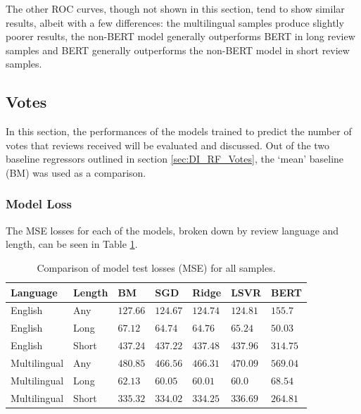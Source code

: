 The other ROC curves, though not shown in this section, tend to show similar results, albeit with a few differences: the multilingual samples produce slightly poorer results, the non-BERT model generally outperforms BERT in long review samples and BERT generally outperforms the non-BERT model in short review samples.

\subsection{Votes} \label{sec:Res_RF_Votes}

In this section, the performances of the models trained to predict the number of votes that reviews received will be evaluated and discussed. Out of the two baseline regressors outlined in section \ref{sec:DI_RF_Votes}, the `mean' baseline (BM) was used as a comparison.

\subsubsection{Model Loss}

The MSE losses for each of the models, broken down by review language and length, can be seen in Table \ref{tab:Res_RF_Votes_CompLoss}.

\begin{table}[ht]
    \centering
    \begin{tabular}{l l | l l l l l}
        \toprule
        \textbf{Language} & \textbf{Length} & \textbf{BM} & \textbf{SGD} & \textbf{Ridge} & \textbf{LSVR} & \textbf{BERT}\\\midrule
        English&Any&$127.66$&$\mathbf{124.67}$&$124.74$&$124.81$&$155.7$\\
        English&Long&$67.12$&$64.74$&$64.76$&$65.24$&$\mathbf{50.03}$\\
        English&Short&$437.24$&$437.22$&$437.48$&$437.96$&$\mathbf{314.75}$\\\midrule
        Multilingual&Any&$480.85$&$466.56$&$\mathbf{466.31}$&$470.09$&$569.04$\\
        Multilingual&Long&$62.13$&$60.05$&$60.01$&$\mathbf{60.0}$&$68.54$\\
        Multilingual&Short&$335.32$&$334.02$&$334.25$&$336.69$&$\mathbf{264.81}$\\
        \bottomrule
    \end{tabular}
    \caption{Comparison of model test losses (MSE) for all samples.}
    \label{tab:Res_RF_Votes_CompLoss}
\end{table}


